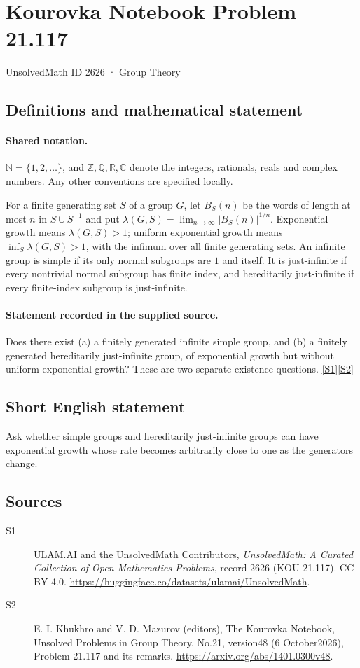 \documentclass[11pt]{article}
\newcommand{\sref}[2]{\hyperlink{source:#1:#2}{[S#2]}}
\begin{document}
\setcounter{section}{2625}
\section{Kourovka Notebook Problem 21.117}\label{2626}
{\small\sffamily UnsolvedMath ID 2626 · Group Theory}
\subsection{Definitions and mathematical statement}

\paragraph{Shared notation.}$\mathbb N=\{1,2,\ldots\}$, and $\mathbb Z,\mathbb Q,\mathbb R,\mathbb C$ denote the integers, rationals, reals and complex numbers. Any other conventions are specified locally.


For a finite generating set $S$ of a group $G$, let $B_S(n)$ be the words of length at most $n$ in $S\cup S^{-1}$ and put $\lambda(G,S)=\lim_{n\to\infty}|B_S(n)|^{1/n}$. Exponential growth means $\lambda(G,S)>1$; uniform exponential growth means $\inf_S\lambda(G,S)>1$, with the infimum over all finite generating sets. An infinite group is simple if its only normal subgroups are $1$ and itself. It is just-infinite if every nontrivial normal subgroup has finite index, and hereditarily just-infinite if every finite-index subgroup is just-infinite.
\paragraph{Statement recorded in the supplied source.}
Does there exist (a) a finitely generated infinite simple group, and (b) a finitely generated hereditarily just-infinite group, of exponential growth but without uniform exponential growth? These are two separate existence questions. \sref{2626}{1}\sref{2626}{2}
\subsection{Short English statement}
Ask whether simple groups and hereditarily just-infinite groups can have exponential growth whose rate becomes arbitrarily close to one as the generators change.
\subsection{Sources}
\begin{description}
\item[\hypertarget{source:2626:1}{S1}] ULAM.AI and the UnsolvedMath Contributors, \emph{UnsolvedMath: A Curated Collection of Open Mathematics Problems}, record 2626 (KOU-21.117). CC BY 4.0. \url{https://huggingface.co/datasets/ulamai/UnsolvedMath}.
\item[\hypertarget{source:2626:2}{S2}] E. I. Khukhro and V. D. Mazurov (editors), The Kourovka Notebook, Unsolved Problems in Group Theory, No.21, version48 (6 October2026), Problem 21.117 and its remarks. \url{https://arxiv.org/abs/1401.0300v48}.
\end{description}
\label{end:2626}
\end{document}
